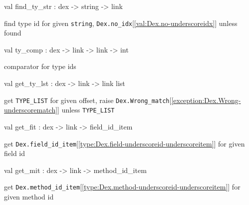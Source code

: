 \documentclass[11pt]{article}
\begin{document}
\label{val:Dex.find-underscorety-underscorestr}\begin{ocamldoccode}
val find_ty_str : dex -> string -> link
\end{ocamldoccode}
\begin{ocamldocdescription}
find type id for given {\tt{string}},
 {\tt{Dex.no\_idx}}[\ref{val:Dex.no-underscoreidx}] unless found


\end{ocamldocdescription}




\label{val:Dex.ty-underscorecomp}\begin{ocamldoccode}
val ty_comp : dex -> link -> link -> int
\end{ocamldoccode}
\begin{ocamldocdescription}
comparator for type ids


\end{ocamldocdescription}




\label{val:Dex.get-underscorety-underscorelst}\begin{ocamldoccode}
val get_ty_lst : dex -> link -> link list
\end{ocamldoccode}
\begin{ocamldocdescription}
get {\tt{TYPE\_LIST}} for given offset,
 raise {\tt{Dex.Wrong\_match}}[\ref{exception:Dex.Wrong-underscorematch}] unless {\tt{TYPE\_LIST}}


\end{ocamldocdescription}




\label{val:Dex.get-underscorefit}\begin{ocamldoccode}
val get_fit : dex -> link -> field_id_item
\end{ocamldoccode}
\begin{ocamldocdescription}
get {\tt{Dex.field\_id\_item}}[\ref{type:Dex.field-underscoreid-underscoreitem}] for given field id


\end{ocamldocdescription}




\label{val:Dex.get-underscoremit}\begin{ocamldoccode}
val get_mit : dex -> link -> method_id_item
\end{ocamldoccode}
\begin{ocamldocdescription}
get {\tt{Dex.method\_id\_item}}[\ref{type:Dex.method-underscoreid-underscoreitem}] for given method id


\end{ocamldocdescription}
\end{document}
